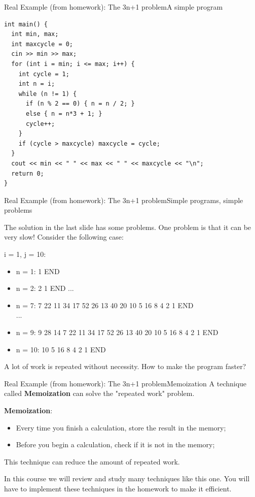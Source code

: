 \begin{frame}[fragile]{Real Example (from homework): The 3n+1 problem}{A simple program}
{\smaller
\begin{verbatim}
int main() {
  int min, max;
  int maxcycle = 0;
  cin >> min >> max;
  for (int i = min; i <= max; i++) {
    int cycle = 1;
    int n = i;
    while (n != 1) {
      if (n % 2 == 0) { n = n / 2; }
      else { n = n*3 + 1; }
      cycle++;
    }
    if (cycle > maxcycle) maxcycle = cycle;
  }
  cout << min << " " << max << " " << maxcycle << "\n";
  return 0;
}
\end{verbatim}}
\end{frame}

\begin{frame}{Real Example (from homework): The 3n+1 problem}{Simple programs, simple
  problems}

The solution in the last slide has some problems. One problem is that
it can be very slow! Consider the following case:
\bigskip

i = 1, j = 10:
\begin{itemize}
  \item n = 1: 1 END
  \item n = 2: 2 1 END
  ...
  \item n = 7: 7 22 11 34 17 52 26 13 40 20 10 5 16 8 4 2 1 END\\
  ...
  \item n = 9: 9 28 14 \alert{7 22 11 34 17 52 26 13 40 20 10 5 16 8 4 2 1 END}
  \item n = 10: \alert{10 5 16 8 4 2 1 END}
\end{itemize}
\bigskip

A lot of work is repeated without necessity. How to make the program faster?
\end{frame}

\begin{frame}{Real Example (from homework): The 3n+1 problem}{Memoization}
  A technique called {\bf Memoization} can solve the "repeated work" problem.
  \bigskip

  {\bf Memoization}:
  \begin{itemize}
    \item Every time you finish a calculation, store the result in the memory;
    \item Before you begin a calculation, check if it is not in the memory;
  \end{itemize}
  \bigskip

  This technique can reduce the amount of repeated work.
  \bigskip

  In this course we will review and study many techniques like this one. You will have to implement these techniques in the homework to make it efficient.
\end{frame}

